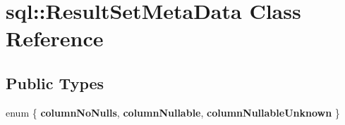 \hypertarget{classsql_1_1_result_set_meta_data}{}\section{sql\+:\+:Result\+Set\+Meta\+Data Class Reference}
\label{classsql_1_1_result_set_meta_data}
\subsection*{Public Types}
\begin{DoxyCompactItemize}
\item 
\hypertarget{classsql_1_1_result_set_meta_data_a3ee5166923b0a5e92703575ef8fdd336}{}\label{classsql_1_1_result_set_meta_data_a3ee5166923b0a5e92703575ef8fdd336} 
enum \{ {\bfseries column\+No\+Nulls}, 
{\bfseries column\+Nullable}, 
{\bfseries column\+Nullable\+Unknown}
 \}
\end{DoxyCompactItemize}
